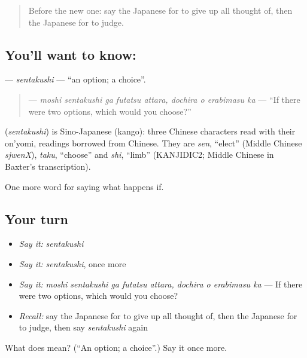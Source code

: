 \label{lesson:JA-C517-sentakushi}



\begin{quote}
Before the new one: say the Japanese for to give up all thought of, then the Japanese for to judge.
\end{quote}

\subsection*{You'll want to know: }
\textbf{} — \emph{sentakushi} — \textquotedblleft{}an option; a choice\textquotedblright{}.

\begin{quote}
\textbf{    } — \emph{moshi sentakushi ga futatsu attara, dochira o erabimasu ka} — \textquotedblleft{}If there were two options, which would you choose?\textquotedblright{}
\end{quote}

\begin{cousinweb}
\textbf{} (\emph{sentakushi}) is Sino-Japanese (kango): three Chinese characters read with their on'yomi, readings borrowed from Chinese. They are \emph{sen}, \textquotedblleft{}elect\textquotedblright{} (Middle Chinese \emph{sjwenX}), \emph{taku}, \textquotedblleft{}choose\textquotedblright{} and \emph{shi}, \textquotedblleft{}limb\textquotedblright{} (KANJIDIC2; Middle Chinese in Baxter's transcription).
\end{cousinweb}

\begin{grammarlens}[title={What you've built}]
One more word for saying what happens if.
\end{grammarlens}

\subsection*{Your turn}
\begin{itemize}
\raggedright
  \item \emph{Say it:} \emph{sentakushi}
  \item \emph{Say it:} \emph{sentakushi}, once more
  \item \emph{Say it:} \emph{moshi sentakushi ga futatsu attara, dochira o erabimasu ka} — If there were two options, which would you choose?
  \item \emph{Recall:} say the Japanese for to give up all thought of, then the Japanese for to judge, then say \emph{sentakushi} again
\end{itemize}

\begin{tcolorbox}[breakable,colback=teal!4,colframe=teal!35!black,title={Before you move on}]
What does  mean? (\textquotedblleft{}An option; a choice\textquotedblright{}.) Say it once more.
\end{tcolorbox}
